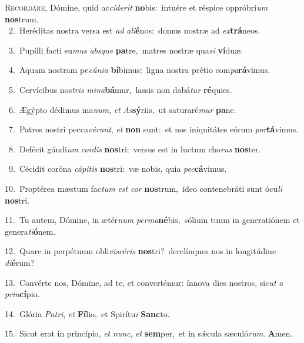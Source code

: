 \lettrine{\initial\textcolor{\initialcolor}{R}}{ecordáre,} Dómine, quid ac\-\textit{cí}\-\textit{de}\textit{rit} \textbf{no}\-bis:~\star intuére et réspice oppróbri\textit{um} \textbf{nos}\-trum.\\
{\numbfont\textcolor{\numbcolor}{~2.}}~Heréditas nostra versa est \textit{ad} \textit{a}\-\textit{li}\textbf{é}nos:~\star domus nostræ ad \textit{ex}\-\textbf{trá}neos.\par
{\numbfont\textcolor{\numbcolor}{~3.}}~Pupílli facti su\textit{mus} \textit{abs}\-\textit{que} \textbf{pa}\-tre,~\star matres nostræ qua\textit{si} \textbf{ví}\-duæ.\par
{\numbfont\textcolor{\numbcolor}{~4.}}~Aquam nostram pe\-\textit{cú}\-\textit{ni}\textit{a} \textbf{bí}\-bimus:~\star ligna nostra prétio com\-\textit{pa}\-\textbf{rá}vimus.\par
{\numbfont\textcolor{\numbcolor}{~5.}}~Cervícibus nos\textit{tris} \textit{mi}\-\textit{na}\textbf{bá}mur,~\star lassis non dabá\textit{tur} \textbf{ré}\-quies.\par
{\numbfont\textcolor{\numbcolor}{~6.}}~Ægýpto dédimus ma\-\textit{num}\-, \textit{et} \textit{As}\-\textbf{sý}riis,~\star ut saturaré\textit{mur} \textbf{pa}\-ne.\par
{\numbfont\textcolor{\numbcolor}{~7.}}~Patres nostri pecca\-\textit{vé}\-\textit{runt}, \textit{et} \textbf{non} sunt:~\star et nos iniquitátes eórum \textit{por}\-\textbf{tá}vimus.\par
{\numbfont\textcolor{\numbcolor}{~8.}}~Defécit gáudi\textit{um} \textit{cor}\-\textit{dis} \textbf{nos}\-tri:~\star versus est in luctum cho\textit{rus} \textbf{nos}\-ter.\par
{\numbfont\textcolor{\numbcolor}{~9.}}~Cécidit coróna \textit{cá}\-\textit{pi}\textit{tis} \textbf{nos}\-tri:~\star væ nobis, quia \textit{pec}\-\textbf{cá}vimus.\par
{\numbfont\textcolor{\numbcolor}{10.}}~Proptérea mæstum fac\textit{tum} \textit{est} \textit{cor} \textbf{nos}\-trum,~\star ídeo contenebráti sunt ócu\textit{li} \textbf{nos}\-tri.\par
{\numbfont\textcolor{\numbcolor}{11.}}~Tu autem, Dómine, in ætér\textit{num} \textit{per}\-\textit{ma}\textbf{né}bis,~\star sólium tuum in generatiónem et genera\-\textit{ti}\-\textbf{ó}nem.\par
{\numbfont\textcolor{\numbcolor}{12.}}~Quare in perpétuum obli\-\textit{vi}\-\textit{scé}\textit{ris} \textbf{nos}\-tri?~\star derelínques nos in longitúdine \textit{di}\-\textbf{é}rum?\par
{\numbfont\textcolor{\numbcolor}{13.}}~Convérte nos, Dómine, ad te, et convertémur: ínnova dies nostros, sic\textit{ut} \textit{a} \textit{prin}\-\textbf{cí}pio.\par
{\numbfont\textcolor{\numbcolor}{14.}}~Glória \textit{Pa}\-\textit{tri}, \textit{et} \textbf{Fí}\-lio,~\star et Spirítu\textit{i} \textbf{Sanc}\-to.\par
{\numbfont\textcolor{\numbcolor}{15.}}~Sicut erat in princípio, \textit{et} \textit{nunc}\-, \textit{et} \textbf{sem}\-per,~\star et in sǽcula sæculó\-\textit{rum}\-. \textbf{A}\-men.\par
